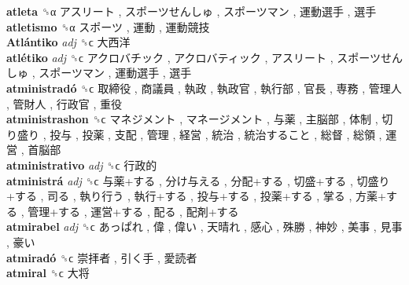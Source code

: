 \textbf{atleta} ␝α   アスリート ,  スポーツせんしゅ ,  スポーツマン ,  運動選手 ,  選手   \\
\textbf{atletismo} ␝α   スポーツ ,  運動 ,  運動競技   \\
\textbf{Atlántiko} \emph{adj}  ␝ϲ   大西洋   \\
\textbf{atlétiko} \emph{adj}  ␝ϲ   アクロバチック ,  アクロバティック ,  アスリート ,  スポーツせんしゅ ,  スポーツマン ,  運動選手 ,  選手   \\
\textbf{atministradó} ␝ϲ   取締役 ,  商議員 ,  執政 ,  執政官 ,  執行部 ,  官長 ,  専務 ,  管理人 ,  管財人 ,  行政官 ,  重役   \\
\textbf{atministrashon} ␝ϲ   マネジメント ,  マネージメント ,  与薬 ,  主脳部 ,  体制 ,  切り盛り ,  投与 ,  投薬 ,  支配 ,  管理 ,  経営 ,  統治 ,  統治すること ,  総督 ,  総領 ,  運営 ,  首脳部   \\
\textbf{atministrativo} \emph{adj}  ␝ϲ   行政的   \\
\textbf{atministrá} \emph{adj}  ␝ϲ   与薬+する ,  分け与える ,  分配+する ,  切盛+する ,  切盛り+する ,  司る ,  執り行う ,  執行+する ,  投与+する ,  投薬+する ,  掌る ,  方薬+する ,  管理+する ,  運営+する ,  配る ,  配剤+する   \\
\textbf{atmirabel} \emph{adj}  ␝ϲ   あっぱれ ,  偉 ,  偉い ,  天晴れ ,  感心 ,  殊勝 ,  神妙 ,  美事 ,  見事 ,  豪い   \\
\textbf{atmiradó} ␝ϲ   崇拝者 ,  引く手 ,  愛読者   \\
\textbf{atmiral} ␝ϲ   大将   \\
